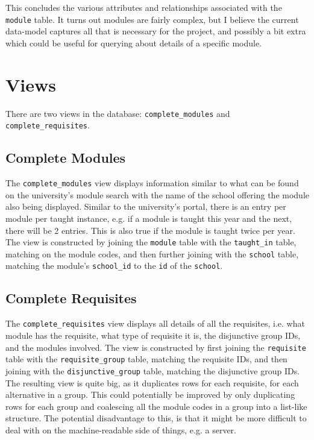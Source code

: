     This concludes the various attributes and relationships associated with the
    \texttt{module} table. It turns out modules are fairly complex, but I
    believe the current data-model captures all that is necessary for the
    project, and possibly a bit extra which could be useful for querying about
    details of a specific module.

\section{Views}
There are two views in the database: \texttt{complete\_modules} and
\texttt{complete\_requisites}.

    \subsection{Complete Modules}
    The \texttt{complete\_modules} view displays
    information similar to what can be found on the university's module search 
    with the name of the school offering the module also being displayed.
    Similar to the university's portal, there is an entry per module per taught
    instance, e.g. if a module is taught this year and the next, there will be 2
    entries. This is also true if the module is taught twice per year. The view
    is constructed by joining the \texttt{module} table with the
    \texttt{taught\_in} table, matching on the module codes, and then further
    joining with the \texttt{school} table, matching the module's
    \texttt{school\_id} to the \texttt{id} of the \texttt{school}.

    \subsection{Complete Requisites}
    The \texttt{complete\_requisites} view displays all details of all the
    requisites, i.e. what module has the requisite, what type of requisite it
    is, the disjunctive group IDs, and the modules involved. The view is
    constructed by first joining the \texttt{requisite} table with the
    \texttt{requisite\_group} table, matching the requisite IDs, and then
    joining with the \texttt{disjunctive\_group} table, matching the disjunctive
    group IDs. The resulting view is quite big, as it duplicates rows for each
    requisite, for each alternative in a group. This could potentially be
    improved by only duplicating rows for each group and coalescing all the
    module codes in a group into a list-like structure. The potential
    disadvantage to this, is that it might be more difficult to deal with on the
    machine-readable side of things, e.g. a server.

